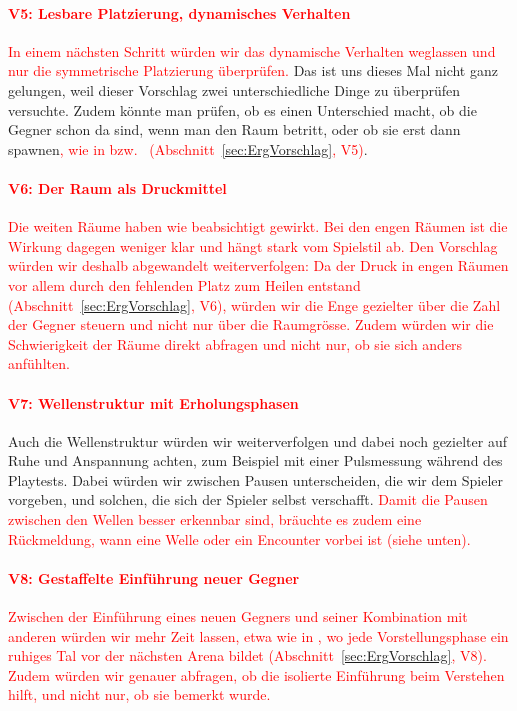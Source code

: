 \documentclass[../Main.tex]{subfiles}
\begin{document}
\paragraph{\textcolor{red}{V5: Lesbare Platzierung, dynamisches Verhalten}}
\textcolor{red}{In einem nächsten Schritt würden wir das dynamische Verhalten weglassen und nur die symmetrische Platzierung überprüfen.} Das ist uns dieses Mal nicht ganz gelungen, weil dieser Vorschlag zwei unterschiedliche Dinge zu überprüfen versuchte. Zudem könnte man prüfen, ob es einen Unterschied macht, ob die Gegner schon da sind, wenn man den Raum betritt, oder ob sie erst dann spawnen\textcolor{red}{, wie in  bzw.\  (Abschnitt~\ref{sec:ErgVorschlag}, V5)}.

\paragraph{\textcolor{red}{V6: Der Raum als Druckmittel}}
\textcolor{red}{Die weiten Räume haben wie beabsichtigt gewirkt. Bei den engen Räumen ist die Wirkung dagegen weniger klar und hängt stark vom Spielstil ab. Den Vorschlag würden wir deshalb abgewandelt weiterverfolgen: Da der Druck in engen Räumen vor allem durch den fehlenden Platz zum Heilen entstand (Abschnitt~\ref{sec:ErgVorschlag}, V6), würden wir die Enge gezielter über die Zahl der Gegner steuern und nicht nur über die Raumgrösse. Zudem würden wir die Schwierigkeit der Räume direkt abfragen und nicht nur, ob sie sich anders anfühlten.}

\paragraph{\textcolor{red}{V7: Wellenstruktur mit Erholungsphasen}}
Auch die Wellenstruktur würden wir weiterverfolgen und dabei noch gezielter auf Ruhe und Anspannung achten, zum Beispiel mit einer Pulsmessung während des Playtests.\autocite[285--287]{drachen2018gamesuserresearch} Dabei würden wir zwischen Pausen unterscheiden, die wir dem Spieler vorgeben, und solchen, die sich der Spieler selbst verschafft. \textcolor{red}{Damit die Pausen zwischen den Wellen besser erkennbar sind, bräuchte es zudem eine Rückmeldung, wann eine Welle oder ein Encounter vorbei ist (siehe unten).}

\paragraph{\textcolor{red}{V8: Gestaffelte Einführung neuer Gegner}}
\textcolor{red}{Zwischen der Einführung eines neuen Gegners und seiner Kombination mit anderen würden wir mehr Zeit lassen, etwa wie in , wo jede Vorstellungsphase ein ruhiges Tal vor der nächsten Arena bildet (Abschnitt~\ref{sec:ErgVorschlag}, V8). Zudem würden wir genauer abfragen, ob die isolierte Einführung beim Verstehen hilft, und nicht nur, ob sie bemerkt wurde.}
\end{document}
